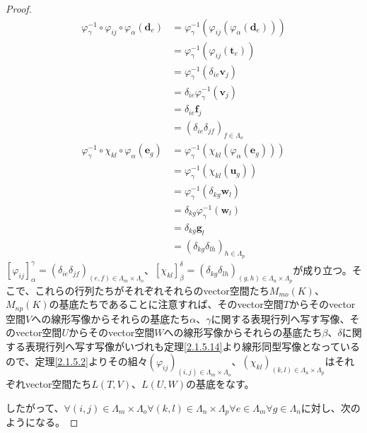 \documentclass[dvipdfmx]{jsarticle}
\begin{document}
\begin{proof}
\begin{align*}
\varphi_{\gamma}^{- 1} \circ \varphi_{ij} \circ \varphi_{\alpha}\left( \mathbf{d}_{e} \right) &= \varphi_{\gamma}^{- 1}\left( \varphi_{ij}\left( \varphi_{\alpha}\left( \mathbf{d}_{e} \right) \right) \right)\\
&= \varphi_{\gamma}^{- 1}\left( \varphi_{ij}\left( \mathbf{t}_{e} \right) \right)\\
&= \varphi_{\gamma}^{- 1}\left( \delta_{ie}\mathbf{v}_{j} \right)\\
&= \delta_{ie}\varphi_{\gamma}^{- 1}\left( \mathbf{v}_{j} \right)\\
&= \delta_{ie}\mathbf{f}_{j}\\
&= \left( \delta_{ie}\delta_{jf} \right)_{f \in \varLambda_{o}}\\
\varphi_{\gamma}^{- 1} \circ \chi_{kl} \circ \varphi_{\alpha}\left( \mathbf{e}_{g} \right) &= \varphi_{\gamma}^{- 1}\left( \chi_{kl}\left( \varphi_{\alpha}\left( \mathbf{e}_{g} \right) \right) \right)\\
&= \varphi_{\gamma}^{- 1}\left( \chi_{kl}\left( \mathbf{u}_{g} \right) \right)\\
&= \varphi_{\gamma}^{- 1}\left( \delta_{kg}\mathbf{w}_{l} \right)\\
&= \delta_{kg}\varphi_{\gamma}^{- 1}\left( \mathbf{w}_{l} \right)\\
&= \delta_{kg}\mathbf{g}_{l}\\
&= \left( \delta_{kg}\delta_{lh} \right)_{h \in \varLambda_{p}}
\end{align*}
$\left[ \varphi_{ij} \right]^{\gamma}_{\alpha} = \left( \delta_{ie}\delta_{jf} \right)_{(e,f) \in \varLambda_{m} \times \varLambda_{o}}$、$\left[ \chi_{kl} \right]^{\delta}_{\beta} = \left( \delta_{kg}\delta_{lh} \right)_{(g,h) \in \varLambda_{n} \times \varLambda_{p}}$が成り立つ。そこで、これらの行列たちがそれぞれそれらのvector空間たち$M_{mo}(K)$、$M_{np}(K)$の基底たちであることに注意すれば、そのvector空間$T$からそのvector空間$V$への線形写像からそれらの基底たち$\alpha$、$\gamma$に関する表現行列へ写す写像、そのvector空間$U$からそのvector空間$W$への線形写像からそれらの基底たち$\beta$、$\delta$に関する表現行列へ写す写像がいづれも定理\ref{2.1.5.14}より線形同型写像となっているので、定理\ref{2.1.5.2}よりその組々$\left( \varphi_{ij} \right)_{(i,j) \in \varLambda_{m} \times \varLambda_{o}}$、$\left(\chi_{kl}\right)_{(k,l) \in \varLambda_{n} \times \varLambda_{p}}$はそれぞれvector空間たち$L(T,V)$、$L(U,W)$の基底をなす。\par
したがって、$\forall(i,j) \in \varLambda_{m} \times \varLambda_{o}\forall(k,l) \in \varLambda_{n} \times \varLambda_{p}\forall e \in \varLambda_{m}\forall g \in \varLambda_{n}$に対し、次のようになる。

\end{proof}
\end{document}
